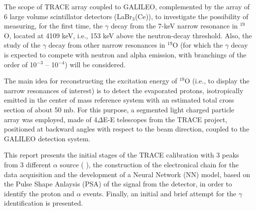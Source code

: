 The scope of TRACE array coupled to GALILEO, complemented by the array of 6 large volume scintillator detectors (LaBr$_{3}$(Ce)), to investigate the possibility of measuring, for the first time, the $\gamma$ decay from the 7-keV narrow resonance in $^{19}$O, located at 4109 keV, i.e., 153 keV above the neutron-decay threshold. Also, the study of the $\gamma$ decay from other narrow resonances in $^{19}$O (for which the $\gamma$ decay is expected to compete with neutron and alpha emission, with branchings of the order of 10$^{-3}$ – 10$^{-4}$) will be considered.

The main idea for reconstructing the excitation energy of $^{19}$O (i.e., to display the narrow resonances of interest) is to detect the evaporated protons, isotropically emitted in the center of mass reference system with an estimated total cross section of about 50 mb. For this purpose, a segmented light charged particle array was employed, made of 4$\Delta$E-E telescopes from the TRACE project, positioned at backward angles with respect to the beam direction, coupled to the GALILEO detection system.

This report presents the initial stages of the TRACE calibration with 3 peaks from 3 different $\alpha$ source ( ), the construction of the electronical chain for the data acquisition and the development of a Neural Network (NN) model, based on the Pulse Shape Anlaysis (PSA) of the signal from the detector, in order to identify the proton and $\alpha$ events. Finally, an initial and brief attempt for the $\gamma$ identification is presented.
